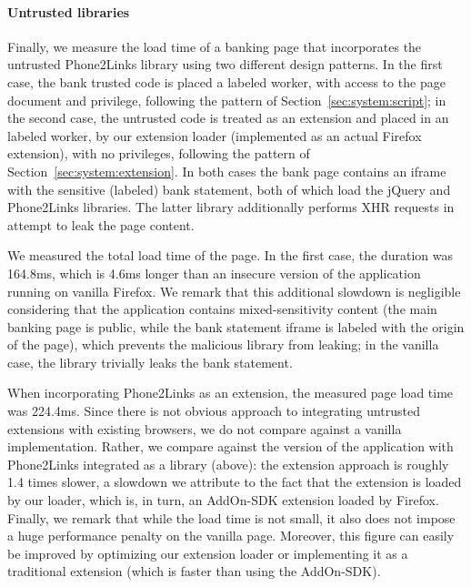 \paragraph{Untrusted libraries}

Finally, we measure the load time of a banking page that incorporates
the untrusted Phone2Links library using two different design patterns.
%
In the first case, the bank trusted code is placed a labeled worker,
with access to the page document and privilege, following the pattern
of Section~\ref{sec:system:script}; in the second case, the untrusted
code is treated as an extension and placed in an labeled worker, by
our extension loader (implemented as an actual Firefox extension),
with no privileges, following the pattern of
Section~\ref{sec:system:extension}.
%
In both cases the bank page contains an iframe with the sensitive
(labeled) bank statement, both of which load the jQuery and
Phone2Links libraries.
%
The latter library additionally performs XHR requests in attempt to
leak the page content.

We measured the total load time of the page. In the first case, the
duration was 164.8ms, which is 4.6ms longer than an insecure version
of the application running on vanilla Firefox.
%
We remark that this additional slowdown is negligible considering that
the application contains mixed-sensitivity content (the main banking
page is public, while the bank statement iframe is labeled with the
origin of the page), which \sys{} prevents the malicious library from
leaking; in the vanilla case, the library trivially leaks the bank
statement.

When incorporating Phone2Links as an extension, the measured page load
time was 224.4ms.
%
Since there is not obvious approach to integrating untrusted
extensions with existing browsers, we do not compare against a vanilla
implementation.
%
Rather, we compare against the version of the application with
Phone2Links integrated as a library (above): the extension approach is
roughly 1.4 times slower, a slowdown we attribute to the fact that the
extension is loaded by our loader, which is, in turn, an AddOn-SDK
extension loaded by Firefox.
%
Finally, we remark that while the load time is not small, it also does
not impose a huge performance penalty on the vanilla page.
%
Moreover, this figure can easily be improved by optimizing our
extension loader or implementing it as a traditional extension (which
is faster than using the AddOn-SDK).



